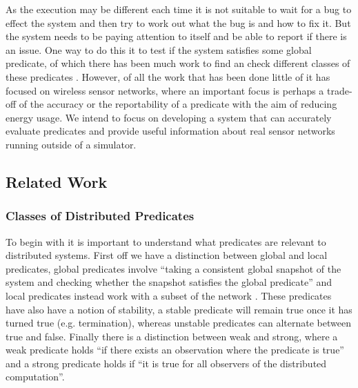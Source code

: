 As the execution may be different each time it is not suitable to wait for a bug to effect the system and then try to work out what the bug is and how to fix it. But the system needs to be paying attention to itself and be able to report if there is an issue. One way to do this it to test if the system satisfies some global predicate, of which there has been much work to find an check different classes of these predicates \cite{553309,345831,277788}. However, of all the work that has been done little of it has focused on wireless sensor networks, where an important focus is perhaps a trade-off of the accuracy or the reportability of a predicate with the aim of reducing energy usage. We intend to focus on developing a system that can accurately evaluate predicates and provide useful information about real sensor networks running outside of a simulator.


\subsection{Related Work}

\subsubsection*{Classes of Distributed Predicates}

To begin with it is important to understand what predicates are relevant to distributed systems. First off we have a distinction between global and local predicates, global predicates involve ``taking a consistent global snapshot of the system and checking whether the snapshot satisfies the global predicate'' \cite{277788} and local predicates instead work with a subset of the network \cite{553309}. These predicates have also have a notion of stability, a stable predicate will remain true once it has turned true (e.g. termination), whereas unstable predicates can alternate between true and false. Finally there is a distinction between weak and strong, where a weak predicate holds ``if there exists an observation where the predicate is true'' and a strong predicate holds if ``it is true for all observers of the distributed computation''.  \cite{553309,Cooper:1991:CDG:127695.122774}

